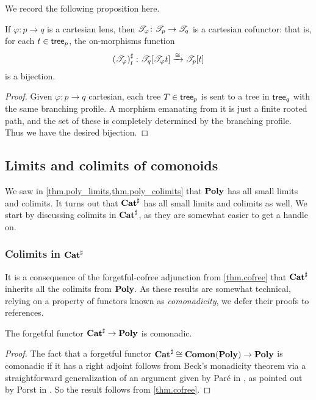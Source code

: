 \documentclass[Book-Poly]{subfiles}
\begin{document}
We record the following proposition here.%

\begin{proposition}
If $\varphi\colon p\to q$ is a cartesian lens, then $\mathscr{T}_{\varphi}\colon\mathscr{T}_{p}\to\mathscr{T}_{q}$ is a cartesian cofunctor: that is, for each $t\in\mathsf{tree}_p$, the on-morphisms function
\[
    \left(\mathscr{T}_{\varphi}\right)^\sharp_t\colon\mathscr{T}_{q}[\mathscr{T}_{\varphi}t]\xrightarrow{\cong}\mathscr{T}_{p}[t]
\]
is a bijection.
\end{proposition}
\begin{proof}
Given $\varphi\colon p\to q$ cartesian, each tree $T\in\mathsf{tree}_p$ is sent to a tree in $\mathsf{tree}_q$ with the same branching profile. A morphism emanating from it is just a finite rooted path, and the set of these is completely determined by the branching profile. Thus we have the desired bijection.
\end{proof}

\subsection{Limits and colimits of comonoids}

We saw in \cref{thm.poly_limits,thm.poly_colimits} that $\mathbf{Poly}$ has all small limits and colimits.
It turns out that $\mathbf{Cat}^\sharp$ has all small limits and colimits as well.
We start by discussing colimits in $\mathbf{Cat}^\sharp$, as they are somewhat easier to get a handle on.

\subsubsection{Colimits in $\mathbf{Cat}^\sharp$}

It is a consequence of the forgetful-cofree adjunction from \cref{thm.cofree} that $\mathbf{Cat}^\sharp$ inherits all the colimits from $\mathbf{Poly}$.
As these results are somewhat technical, relying on a property of functors known as \emph{comonadicity}, we defer their proofs to references.

\begin{proposition}[Porst]
The forgetful functor $\mathbf{Cat}^\sharp\to\mathbf{Poly}$ is comonadic.
\end{proposition}
\begin{proof}
The fact that a forgetful functor $\mathbf{Cat}^\sharp\cong\mathbf{Comon}(\mathbf{Poly})\to\mathbf{Poly}$ is comonadic if it has a right adjoint follows from Beck's monadicity theorem via a straightforward generalization of an argument given by Par{\'e} in \cite[pp.~138-9]{pare1969absolute}, as pointed out by Porst in \cite[Fact~3.1]{porst2019colimits}.
So the result follows from \cref{thm.cofree}.
\end{proof}
\end{document}
